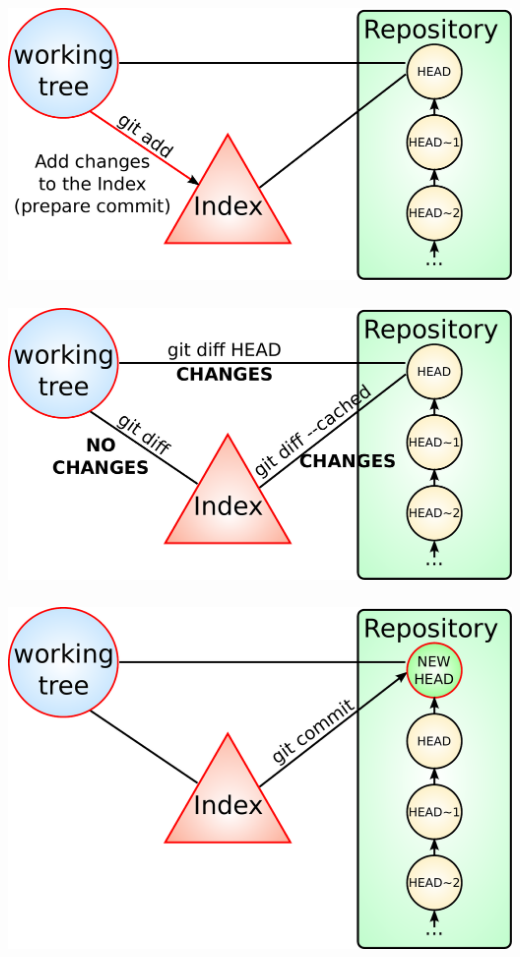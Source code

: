 \begin{frame}
  \frametitle{\insertsubsection}
  \begin{center}
    \includegraphics[width=1.0\textwidth]{images/pdf/git-detailed-4.pdf}
  \end{center}
\end{frame}
\begin{frame}
  \frametitle{\insertsubsection}
  \begin{center}
    \includegraphics[width=1.0\textwidth]{images/pdf/git-detailed-5.pdf}
  \end{center}
\end{frame}
\begin{frame}
  \frametitle{\insertsubsection}
  \begin{center}
    \includegraphics[width=1.0\textwidth]{images/pdf/git-detailed-6.pdf}
  \end{center}
\end{frame}
